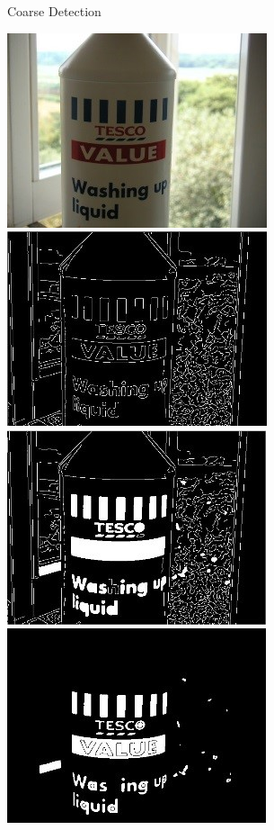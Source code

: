 \documentclass[a0paper,portrait]{baposter}
\begin{document}
\begin{poster}
\begin{posterbox}[name=example,span=2,column=1,row=0]{Coarse Detection}
\begin{center}
  \includegraphics[width=1.45\headerheight]{step1.jpg}
  \includegraphics[width=1.45\headerheight]{step2.jpg}
  \includegraphics[width=1.45\headerheight]{step3.jpg}
  \vspace{0.3cm}
  \hfill
  \includegraphics[width=1.45\headerheight]{step4.jpg}

\end{center}
\end{posterbox}
\end{poster}
\end{document}
